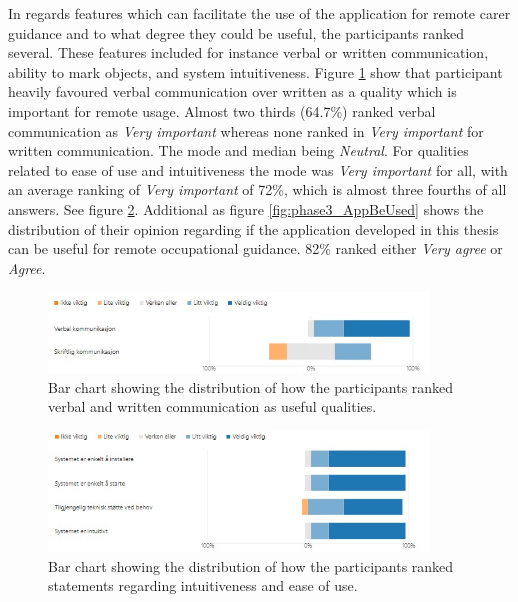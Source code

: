 In regards features which can facilitate the use of the application for remote carer guidance and to what degree they could be useful, the participants ranked several. These features included for instance verbal or written communication, ability to mark objects, and system intuitiveness. Figure \ref{fig:phase3_VerbalWritten} show that participant heavily favoured verbal communication over written as a quality which is important for remote usage. Almost two thirds (64.7\%) ranked verbal communication as \textit{Very important} whereas none ranked in \textit{Very important} for written communication. The mode and median being \textit{Neutral}.
For qualities related to ease of use and intuitiveness the mode was \textit{Very important} for all, with an average ranking of \textit{Very important} of 72\%, which is almost three fourths of all answers.  See figure \ref{fig:phase3_Intuitiveness}.   
Additional as figure \ref{fig:phase3_AppBeUsed} shows the distribution of their opinion regarding if the application developed in this thesis can be useful for remote occupational guidance. 82\% ranked either \textit{Very agree} or \textit{Agree}.


\begin{figure}[H]
  \centering
   \captionsetup{width=.8\linewidth}
    \includegraphics[width=0.9\textwidth]{fig/phase_3/survey/RemoteVerbalWritten.jpg}
 \caption{Bar chart showing the distribution of how the participants ranked verbal and written communication as useful qualities.}
\label{fig:phase3_VerbalWritten}
\end{figure}

\begin{figure}[H]
  \centering
   \captionsetup{width=.8\linewidth}
    \includegraphics[width=0.9\textwidth]{fig/phase_3/survey/EaseOfUse.jpg}
 \caption{Bar chart showing the distribution of how the participants ranked statements regarding intuitiveness and ease of use.}
\label{fig:phase3_Intuitiveness}
\end{figure}


